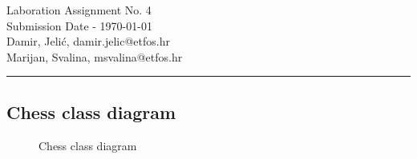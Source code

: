 \documentclass[11pt,a4paper]{article}
\begin{document}
\large
Laboration Assignment No. 4\\
Submission Date - \yyyymmdddate \today \\
Damir, Jelić, damir.jelic@etfos.hr \\
Marijan, Svalina, msvalina@etfos.hr
\\
\rule{\linewidth}{0.1mm}

\setcounter{section}{4}
\subsection{Chess class diagram}
\begin{figure}[htb]
    \begin{center}
        \setlength\fboxsep{0pt}
        \caption{Chess class diagram}
        \label{fig:class_diag}
    \end{center}
\end{figure}
\end{document}
